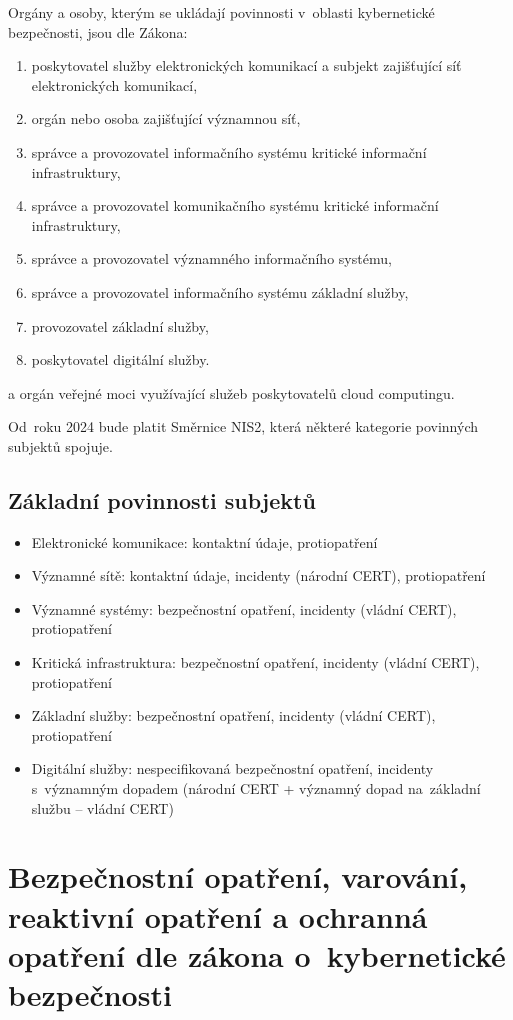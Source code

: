 Orgány a osoby, kterým se ukládají povinnosti v~oblasti kybernetické bezpečnosti, jsou dle Zákona:

\begin{enumerate}[label=\alph*)]
\item poskytovatel služby elektronických komunikací a subjekt zajišťující síť elektronických komunikací,
\item orgán nebo osoba zajišťující významnou síť,
\item správce a provozovatel informačního systému kritické informační infrastruktury,
\item správce a provozovatel komunikačního systému kritické informační infrastruktury,
\item správce a provozovatel významného informačního systému,
\item správce a provozovatel informačního systému základní služby,
\item provozovatel základní služby,
\item poskytovatel digitální služby.
\end{enumerate}

a orgán veřejné moci využívající služeb poskytovatelů cloud computingu.

Od~roku 2024 bude platit Směrnice NIS2, která některé kategorie povinných subjektů spojuje.


\subsection{Základní povinnosti subjektů}
\begin{itemize}
    \item Elektronické komunikace: kontaktní údaje, protiopatření
    \item Významné sítě: kontaktní údaje, incidenty (národní CERT), protiopatření
    \item Významné systémy: bezpečnostní opatření, incidenty (vládní CERT), protiopatření
    \item Kritická infrastruktura: bezpečnostní opatření, incidenty (vládní CERT), protiopatření
    \item Základní služby: bezpečnostní opatření, incidenty (vládní CERT), protiopatření
    \item Digitální služby: nespecifikovaná bezpečnostní opatření, incidenty s~významným dopadem (národní CERT + významný dopad na~základní službu -- vládní CERT)
\end{itemize}

\clearpage
\section{Bezpečnostní opatření, varování, reaktivní opatření a ochranná opatření dle zákona o~kybernetické bezpečnosti}

